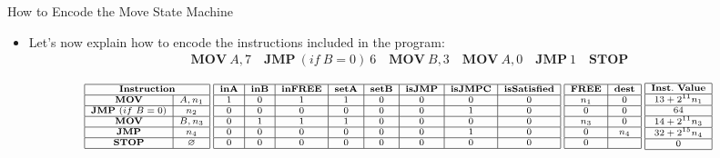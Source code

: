 \begin{frame}[allowframebreaks]{How to Encode the Move State Machine}
\begin{itemize}
\item Let's now explain how to encode the instructions included in the program:
\begin{align*}
\mathbf{MOV}~A, 7 \quad \mathbf{JMP}~(if~B = 0)~6 \quad \mathbf{MOV}~B,3 \quad \mathbf{MOV}~A,0 \quad \mathbf{JMP}~1 \quad \mathbf{STOP}
\end{align*}
\end{itemize}
\small
\[
\scriptsize
\begin{array}{|c|c|}
\hline
\multicolumn{2}{|c|}{\mathbf{Instruction}} \\ \hline
\mathbf{MOV} & A, n_1 \\ \hline
\mathbf{JMP}~(if~B = 0) & n_2 \\ \hline
\mathbf{MOV} & B,n_3 \\ \hline
\mathbf{JMP} & n_4 \\ \hline
\mathbf{STOP} & \emptyset \\ \hline
\end{array}
\hspace{0.1cm}
\begin{array}{|c|c|c|c|c|c|c|c|}
\hline
\textbf{inA} & \textbf{inB} & \textbf{inFREE} & \textbf{setA} & \textbf{setB} & \textbf{isJMP} & \textbf{isJMPC} & \textbf{isSatisfied} \\ \hline
1 & 0 & 1 & 1 & 0 & 0 & 0 & 0 \\ \hline
0 & 0 & 0 & 0 & 0 & 0 & 1 & 0 \\ \hline
0 & 1 & 1 & 1 & 0 & 0 & 0 & 0 \\ \hline
0 & 0 & 0 & 0 & 0 & 0 & 1 & 0 \\ \hline
0 & 0 & 0 & 0 & 0 & 0 & 0 & 0 \\ \hline
\end{array}
\hspace{0.1cm}
\begin{array}{|c|c|}
\hline
\mathbf{FREE} & \mathbf{dest} \\ \hline
n_1 & 0 \\ \hline
0 & 0 \\ \hline
n_3 & 0 \\ \hline
0 & n_4 \\ \hline
0 & \\ \hline
\end{array}
\hspace{0.1cm}
\begin{array}{|c|}
\hline
\mathbf{Inst.~Value} \\ \hline
13 + 2^{11}n_1 \\ \hline
64 \\ \hline
14 + 2^{11}n_3 \\ \hline
32 + 2^{15}n_4 \\ \hline
0 \\ \hline
\end{array}
\]


\end{frame}
